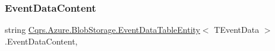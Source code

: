 \subsubsection{\texorpdfstring{Event\+Data\+Content}{EventDataContent}}
{\footnotesize\ttfamily string \hyperlink{classCqrs_1_1Azure_1_1BlobStorage_1_1EventDataTableEntity}{Cqrs.\+Azure.\+Blob\+Storage.\+Event\+Data\+Table\+Entity}$<$ T\+Event\+Data $>$.Event\+Data\+Content\hspace{0.3cm}{\ttfamily [get]}, {\ttfamily [set]}}

